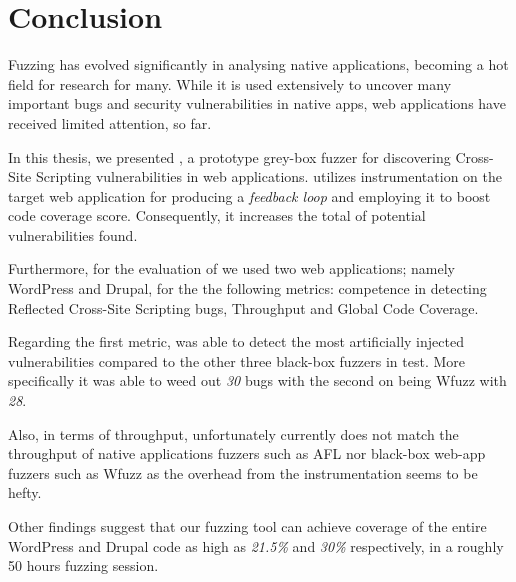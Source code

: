 \chapter{Conclusion}
\label{sec:conclusion}
\vspace*{0.25cm}

Fuzzing has evolved significantly in analysing native applications, becoming a hot field for research for many. While it is used extensively to uncover many important bugs and security vulnerabilities in native apps, web applications have received limited attention, so far.

In this thesis, we presented \pname{}, a prototype grey-box fuzzer for discovering Cross-Site Scripting vulnerabilities in web applications. \pname{} utilizes instrumentation on the target web application for producing a \emph{feedback loop} and employing it to boost code coverage score. Consequently, it increases the total of potential vulnerabilities found.

Furthermore, for the evaluation of \pname{} we used two web applications; namely WordPress and Drupal, for the the following metrics: competence in detecting Reflected Cross-Site Scripting bugs, Throughput and Global Code Coverage.

Regarding the first metric, \pname{} was able to detect the most artificially injected vulnerabilities compared to the other three black-box fuzzers in test. More specifically it was able to weed out \emph{30} bugs with the second on being Wfuzz with \emph{28}.

Also, in terms of throughput, unfortunately currently \pname{} does not match the throughput of native applications fuzzers such as AFL nor black-box web-app fuzzers such as Wfuzz as the overhead from the instrumentation seems to be hefty.

Other findings suggest that our fuzzing tool can achieve coverage of the entire WordPress and Drupal code as high as \emph{21.5\%} and \emph{30\%} respectively, in a roughly 50 hours fuzzing session.


